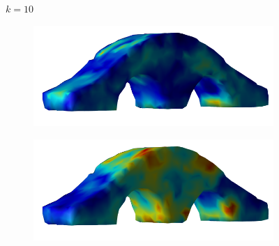\documentclass[11pt,titlepage]{article}
\begin{document}
\begin{figure}[!htbp]
\begin{center}
        $k=10$
        \quad
        \begin{subfigure}[b]{0.4\textwidth}
            \centering
            \includegraphics[width=\textwidth]{jacopt_vm/resized/archbridge_tiny_11}
        \end{subfigure}
        \begin{subfigure}[b]{0.4\textwidth}
            \centering
            \includegraphics[width=\textwidth]{soropt_vm/resized/archbridge_tiny_11}
        \end{subfigure}\\ 



\end{center}
\end{figure}
\end{document}
